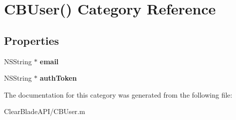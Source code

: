 \hypertarget{category_c_b_user_07_08}{\section{C\+B\+User() Category Reference}
\label{category_c_b_user_07_08}
}
\subsection*{Properties}
\begin{DoxyCompactItemize}
\item 
\hypertarget{category_c_b_user_07_08_a9bdf5fd8da471de347bc15f06e362d2b}{N\+S\+String $\ast$ {\bfseries email}}\label{category_c_b_user_07_08_a9bdf5fd8da471de347bc15f06e362d2b}

\item 
\hypertarget{category_c_b_user_07_08_afb9f1f9c2826ad9a138e63ec3bffe1fc}{N\+S\+String $\ast$ {\bfseries auth\+Token}}\label{category_c_b_user_07_08_afb9f1f9c2826ad9a138e63ec3bffe1fc}

\end{DoxyCompactItemize}


The documentation for this category was generated from the following file\+:\begin{DoxyCompactItemize}
\item 
Clear\+Blade\+A\+P\+I/C\+B\+User.\+m\end{DoxyCompactItemize}
